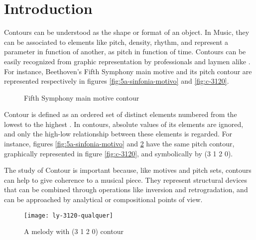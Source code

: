

\section{Introduction}
\label{sec:introduction}

Contours can be understood as the shape or format of an object. In
Music, they can be associated to elements like pitch, density, rhythm,
and represent a parameter in function of another, as pitch in function
of time. Contours can be easily recognized from graphic representation
by professionals and laymen alike \cite{marvin88:generalized}. For
instance, Beethoven's Fifth Symphony main motive and its pitch contour
are represented respectively in figures \ref{fig:5a-sinfonia-motivo}
and \ref{fig:c-3120}.

\begin{figure}[h!]
  \centering

  \subfloat[Contour (3 1 2 0)]{
    \texttt{[image: c-3120]}
    \label{fig:c-3120}
  }
  \caption{Fifth Symphony main motive contour}
  \label{fig:5a-sinfonia}
\end{figure}

Contour is defined as an ordered set of distinct elements numbered
from the lowest to the highest \cite{morris93:directions}. In
contours, absolute values of its elements are ignored, and only the
high-low relationship between these elements is regarded. For
instance, figures \ref{fig:5a-sinfonia-motivo} and \ref{fig:ly-3120}
have the same pitch contour, graphically represented in figure
\ref{fig:c-3120}, and symbolically by (3 1 2 0).

The study of Contour is important because, like motives and pitch
sets, contours can help to give coherence to a musical piece. They
represent structural devices that can be combined through operations
like inversion and retrogradation, and can be approached by analytical
or compositional points of view.

\begin{figure}[h!]
  \centering
  \texttt{[image: ly-3120-qualquer]}
  \caption{A melody with (3 1 2 0) contour}
  \label{fig:ly-3120}
\end{figure}

